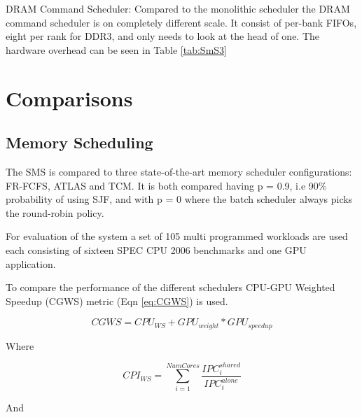 \documentclass[12pt,journal,compsoc]{IEEEtran}
\begin{document}
DRAM Command Scheduler:   Compared to the monolithic scheduler the DRAM command scheduler is on completely different scale.  It consist of per-bank FIFOs, eight per rank for DDR3, and only needs to look at the head of one. The hardware overhead can be seen in Table \ref{tab:SmS3}

\begin{table}[H]
  \centering
  \caption{Storage Overhead of Stage 3: DRAM Command Scheduler \cite{SmS}}\label{tab:SmS3}
\end{table}


\section{Comparisons}
\subsection{Memory Scheduling}
The SMS is compared to three state-of-the-art memory scheduler configurations: FR-FCFS, ATLAS and TCM.  It is both compared having p = 0.9, i.e  90\% probability of using SJF, and with p = 0 where the batch scheduler always picks the round-robin policy.

For evaluation of the system a set of 105 multi programmed workloads are used each consisting of sixteen SPEC CPU 2006 benchmarks and one GPU application.  

To compare the performance of the different schedulers CPU-GPU Weighted Speedup (CGWS) metric (Eqn \ref{eq:CGWS})  is used.

\begin{equation}
CGWS = CPU_{WS} + GPU_{weight}*GPU_{speedup} \label{eq:CGWS}
\end{equation} 

Where
 
\begin{equation}
CPI_{WS} = \sum_{i=1}^{NumCores}\frac{IPC_i^{shared}}{IPC_i^{alone}}
\end{equation}

And 
\end{document}
